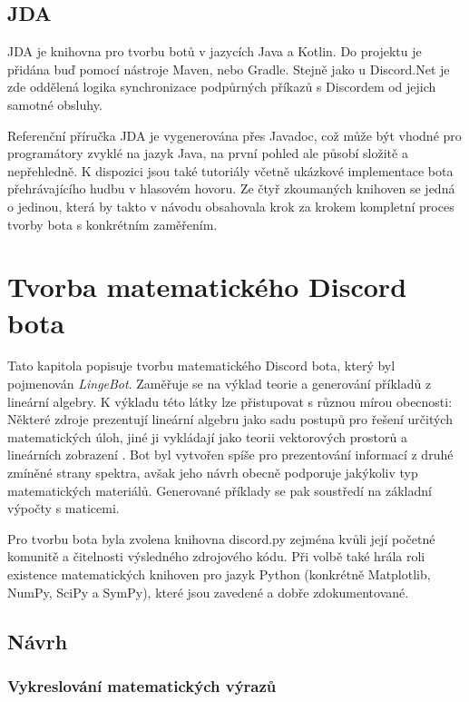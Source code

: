 \documentclass[FM]{tulthesis}
\begin{document}
	\section{JDA}
	
	JDA je knihovna pro tvorbu botů v jazycích Java a Kotlin. Do projektu je přidána buď pomocí nástroje Maven, nebo Gradle. Stejně jako u Discord.Net je zde oddělená logika synchronizace podpůrných příkazů s Discordem od jejich samotné obsluhy.
	
	Referenční příručka JDA je vygenerována přes Javadoc, což může být vhodné pro programátory zvyklé na jazyk Java, na první pohled ale působí složitě a nepřehledně. K dispozici jsou také tutoriály včetně ukázkové implementace bota přehrávajícího hudbu v hlasovém hovoru. Ze čtyř zkoumaných knihoven se jedná o jedinou, která by takto v návodu obsahovala krok za krokem kompletní proces tvorby bota s konkrétním zaměřením.
	
	\chapter{Tvorba matematického Discord bota}\label{Chapter5}
	
	Tato kapitola popisuje tvorbu matematického Discord bota, který byl pojmenován \textit{LingeBot}. Zaměřuje se na výklad teorie a generování příkladů z lineární algebry. K výkladu této látky lze přistupovat s různou mírou obecnosti: Některé zdroje prezentují lineární algebru jako sadu postupů pro řešení určitých matematických úloh, jiné ji vykládají jako teorii vektorových prostorů a lineárních zobrazení \cite{lit_lingebra}. Bot byl vytvořen spíše pro prezentování informací z druhé zmíněné strany spektra, avšak jeho návrh obecně podporuje jakýkoliv typ matematických materiálů. Generované příklady se pak soustředí na základní výpočty s maticemi.
	
	Pro tvorbu bota byla zvolena knihovna discord.py zejména kvůli její početné komunitě a čitelnosti výsledného zdrojového kódu. Při volbě také hrála roli existence matematických knihoven pro jazyk Python (konkrétně Matplotlib, NumPy, SciPy a SymPy), které jsou zavedené a dobře zdokumentované.
		
	\section{Návrh}\label{Chapter5_1}
	
	\subsection{Vykreslování matematických výrazů}
	
\end{document}
